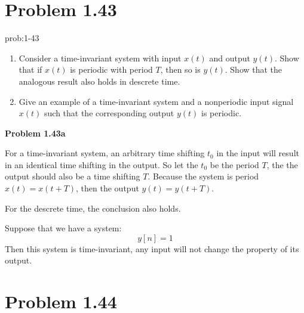 \documentclass[koma,a4paper,utopia,12pt,listings-color,microtype,paralist,colorlinks,urlcolor=red]{org-article}
\begin{document}
\section{Problem 1.43}
\label{sec:org772be8f}


\begin{prob}[]{prob:1-43}
\begin{enumerate}
\item Consider a time-invariant system with input \(x(t)\) and output \(y(t)\).
Show that if \(x(t)\) is periodic with period \(T\), then so is \(y(t)\).
Show that the analogous result also holds in descrete time.
\item Give an example of a time-invariant system and a nonperiodic input signal
\(x(t)\) such that the corresponding output \(y(t)\) is periodic.
\end{enumerate}
\label{prob:1-43}
\end{prob}

\textbf{Problem 1.43a}

For a time-invariant system, an arbitrary time shifting \(t_{0}\) in the input
will result in an identical time shifting in the output. So let the \(t_{0}\) be
the period \(T\), the the output should also be a time shifting \(T\). Because
the system is period \(x(t) = x(t+T)\), then the output \(y(t) = y(t+T)\).

For the descrete time, the conclusion also holds.

Suppose that we have a system:
\begin{equation*}
y[n] = 1
\end{equation*}
Then this system is time-invariant, any input will not change the property of
its output.
\section{Problem 1.44}
\label{sec:orgefef85f}
\end{document}
